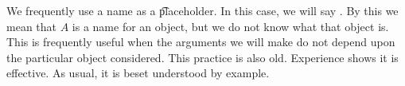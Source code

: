 %
%
%
%
%
%
%


We frequently use a name as a \t{placeholder}.
In this case, we will say .
By this we mean that $A$ is a name for an object, but we do not know what that object is.
This is frequently useful when the arguments we will make do not depend upon the particular object considered.
This practice is also old.
Experience shows it is effective.
As usual, it is beset understood by example.
